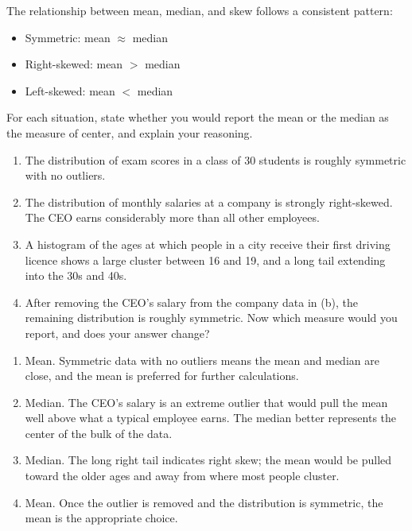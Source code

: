 The relationship between mean, median, and skew follows a consistent
pattern:

\begin{itemize}
    \item Symmetric: mean $\approx$ median
    \item Right-skewed: mean $>$ median
    \item Left-skewed: mean $<$ median
\end{itemize}

\begin{Exercise}[title={Choosing a Measure of Center}, label={ex:choose_center}]
For each situation, state whether you would report the mean or the
median as the measure of center, and explain your reasoning.

\begin{enumerate}
    \item The distribution of exam scores in a class of 30 students
    is roughly symmetric with no outliers.
    \item The distribution of monthly salaries at a company is
    strongly right-skewed. The CEO earns considerably more than
    all other employees.
    \item A histogram of the ages at which people in a city receive
    their first driving licence shows a large cluster between 16
    and 19, and a long tail extending into the 30s and 40s.
    \item After removing the CEO's salary from the company data in
    (b), the remaining distribution is roughly symmetric. Now
    which measure would you report, and does your answer change?
\end{enumerate}
\end{Exercise}

\begin{Answer}[ref={ex:choose_center}]
\begin{enumerate}
    \item Mean. Symmetric data with no outliers means the mean and
    median are close, and the mean is preferred for further
    calculations.
    \item Median. The CEO's salary is an extreme outlier that would
    pull the mean well above what a typical employee earns. The
    median better represents the center of the bulk of the data.
    \item Median. The long right tail indicates right skew; the mean
    would be pulled toward the older ages and away from where most
    people cluster.
    \item Mean. Once the outlier is removed and the distribution is
    symmetric, the mean is the appropriate choice.
\end{enumerate}
\end{Answer}

